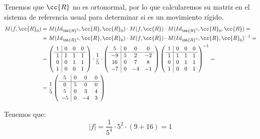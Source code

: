 \begin{ejercicio}
    Tenemos que $\cc{R}$ no es ortonormal, por lo que calcularemos su matriz en el sistema de referencia usual para determinar si es un movimiento rígido.
    \begin{align*}
        M(f, \cc{R}_0) &= M(Id_{\bb{R}^3}, \cc{R}, \cc{R}_0) \cdot M(f, \cc{R}) \cdot M(Id_{\bb{R}^3}, \cc{R}_0, \cc{R}) =\\
        &= M(Id_{\bb{R}^3}, \cc{R}, \cc{R}_0) \cdot M(f, \cc{R}) \cdot M(Id_{\bb{R}^3}, \cc{R}, \cc{R}_0)^{-1} =\\
        &=\left(
        \begin{array}{c|ccc}
            1 & 0 & 0 & 0 \\ \hline
            1 & 1 & 1 & 1 \\
            0 & 0 & 1 & 1 \\
            1 & 0 & 0 & 1
        \end{array}
        \right) \cdot \frac{1}{5}\cdot 
        \left(
        \begin{array}{c|ccc}
            5 & 0 & 0 & 0 \\ \hline
            -9 & 5 & 2 & -2 \\
            16 & 0 & 7 & 8 \\
            -7 & 0 & -4 & -1
        \end{array}
        \right)\left(
        \begin{array}{c|ccc}
            1 & 0 & 0 & 0 \\ \hline
            1 & 1 & 1 & 1 \\
            0 & 0 & 1 & 1 \\
            1 & 0 & 0 & 1
        \end{array}
        \right)^{-1}
        =\\
        &= \frac{1}{5}\left(
        \begin{array}{c|ccc}
            5 & 0 & 0 & 0 \\ \hline
            0 & 5 & 0 & 0 \\
            5 & 0 & 3 & 4 \\
            -5 & 0 & -4 & 3
        \end{array}
        \right)
    \end{align*}

    Tenemos que:
    \begin{equation*}
        |f| = \frac{1}{5^4} \cdot 5^2 \cdot (9 + 16) = 1
    \end{equation*}


\end{ejercicio}
